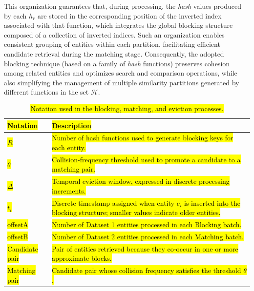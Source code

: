 \documentclass{ieeeaccess}
\begin{document}
This organization guarantees that, during processing, the \textit{hash} values produced by each \( h_r \) are stored in the corresponding position of the inverted index associated with that function, which integrates the global blocking structure composed of a collection of inverted indices. Such an organization enables consistent grouping of entities within each partition, facilitating efficient candidate retrieval during the matching stage. Consequently, the adopted blocking technique (based on a family of \textit{hash} functions) preserves cohesion among related entities and optimizes search and comparison operations, while also simplifying the management of multiple similarity partitions generated by different functions in the set \( \mathcal{H} \).

\begin{table}[!t]
\centering
\caption{\hl{Notation used in the blocking, matching, and eviction processes.}}
\label{tab:notation}
\scriptsize
\renewcommand{\arraystretch}{1.05}
\begin{tabularx}{\columnwidth}{
    >{\centering\arraybackslash}p{}
    >{\raggedright\arraybackslash}X
}
\hline
\hl{\textbf{Notation}} & \hl{\textbf{Description}} \\
\hline
\hl{$R$} & \hl{Number of hash functions used to generate blocking keys for each entity.} \\
\hl{$\theta$} & \hl{Collision-frequency threshold used to promote a candidate to a matching pair.} \\
\hl{$\Delta$} & \hl{Temporal eviction window, expressed in discrete processing increments.} \\
\hl{$t_i$} & \hl{Discrete timestamp assigned when entity $e_i$ is inserted into the blocking structure; smaller values indicate older entities.} \\
\hl{offsetA} & \hl{Number of Dataset 1 entities processed in each Blocking batch.} \\
\hl{offsetB} & \hl{Number of Dataset 2 entities processed in each Matching batch.} \\
\hl{Candidate pair} & \hl{Pair of entities retrieved because they co-occur in one or more approximate blocks.} \\
\hl{Matching pair} & \hl{Candidate pair whose collision frequency satisfies the threshold $\theta$.} \\
\hline
\end{tabularx}
\end{table}
\end{document}
